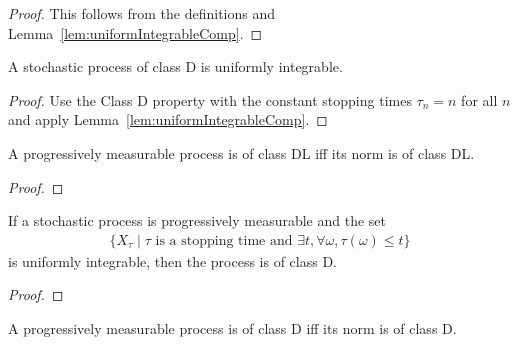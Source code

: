 \begin{proof}
  \leanok
This follows from the definitions and Lemma~\ref{lem:uniformIntegrableComp}.
\end{proof}


\begin{lemma}\label{lem:ClassD.uniformIntegrable}
  \leanok
A stochastic process of class D is uniformly integrable.
\end{lemma}

\begin{proof}\leanok
Use the Class D property with the constant stopping times $\tau_n = n$ for all $n$ and apply Lemma~\ref{lem:uniformIntegrableComp}.
\end{proof}


\begin{lemma}\label{lem:classDL_iff_norm}
  \leanok
A progressively measurable process is of class DL iff its norm is of class DL.
\end{lemma}

\begin{proof}\leanok

\end{proof}


\begin{lemma}\label{lem:classD_of_uniformIntegrable_bounded_stoppingTime}
  \leanok
If a stochastic process is progressively measurable and the set
\begin{align*}
  \{X_\tau \mid \tau \text{ is a stopping time and } \exists t, \forall \omega, \tau(\omega) \le t\}
\end{align*}
is uniformly integrable, then the process is of class D.
\end{lemma}

\begin{proof}\leanok

\end{proof}


\begin{lemma}\label{lem:classD_iff_norm}
  \leanok
A progressively measurable process is of class D iff its norm is of class D.
\end{lemma}

